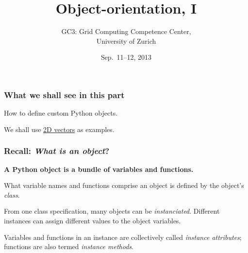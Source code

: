 \documentclass[english,serif,mathserif,xcolor=pdftex,dvipsnames,table]{beamer}
\title[OOP 1]{%
  Object-orientation, I
}
\author[GC3]{%
  GC3: Grid Computing Competence Center, \\
  University of Zurich
}
\date{Sep.~11--12, 2013}
\begin{document}
\maketitle


\begin{frame}
  \frametitle{What we shall see in this part}

  How to define custom Python objects.

  \+
  We shall use \href{http://jccc-mpg.wikidot.com/vectors}{2D
    vectors} as examples.
\end{frame}


\begin{frame}
  \frametitle{Recall: \emph{What is an object}?}
  \textbf{A Python object is a bundle of variables and functions.}

  \+
  What variable names and functions comprise an object is defined
  by the object's \emph{class}.

  \+
  From one class specification, many objects can be
  \emph{instanciated}.  Different instances can assign different
  values to the object variables.

  \+
  Variables and functions in an instance are collectively called
  \emph{instance attributes}; functions are also termed \emph{instance
    methods}.
\end{frame}
\end{document}
